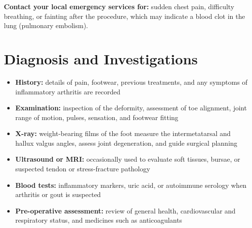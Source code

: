 \textbf{Contact your local emergency services for:} sudden chest pain, difficulty breathing, or fainting after the procedure, which may indicate a blood clot in the lung (pulmonary embolism).

\section*{Diagnosis and Investigations}
\begin{itemize}
    \item \textbf{History:} details of pain, footwear, previous treatments, and any symptoms of inflammatory arthritis are recorded
    \item \textbf{Examination:} inspection of the deformity, assessment of toe alignment, joint range of motion, pulses, sensation, and footwear fitting
    \item \textbf{X-ray:} weight-bearing films of the foot measure the intermetatarsal and hallux valgus angles, assess joint degeneration, and guide surgical planning
    \item \textbf{Ultrasound or MRI:} occasionally used to evaluate soft tissues, bursae, or suspected tendon or stress-fracture pathology
    \item \textbf{Blood tests:} inflammatory markers, uric acid, or autoimmune serology when arthritis or gout is suspected
    \item \textbf{Pre-operative assessment:} review of general health, cardiovascular and respiratory status, and medicines such as anticoagulants
\end{itemize}

